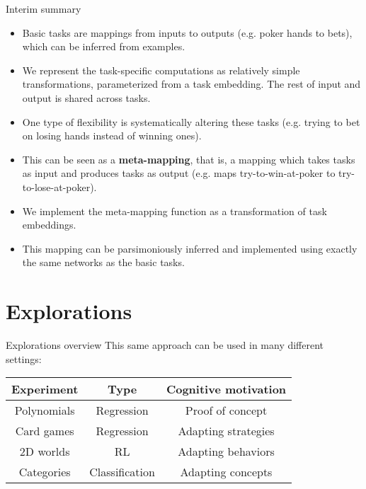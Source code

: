 \documentclass{beamer}
\begin{document}
\begin{frame}{Interim summary}
\begin{itemize}[<+->]
\item Basic tasks are mappings from inputs to outputs (e.g. poker hands to bets), which can be inferred from examples.
\item We represent the task-specific computations as relatively simple transformations, parameterized from a task embedding. The rest of input and output is shared across tasks.
\item One type of flexibility is systematically altering these tasks (e.g. trying to bet on losing hands instead of winning ones).
\item This can be seen as a \textbf{meta-mapping}, that is, a mapping which takes tasks as input and produces tasks as output (e.g. maps try-to-win-at-poker to try-to-lose-at-poker).
\item We implement the meta-mapping function as a transformation of task embeddings.
\item This mapping can be parsimoniously inferred and implemented using exactly the same networks as the basic tasks.
\end{itemize}
\end{frame}

\section{Explorations}

\begin{frame}{Explorations overview}
This same approach can be used in many different settings: 
\begin{table}
\center
\begin{tabular}{|c|c|c|}
\hline
Experiment & Type & Cognitive motivation \\
\hline
\color{lightgray} Polynomials & \color{lightgray} Regression & \color{lightgray} Proof of concept \\
Card games & Regression & Adapting strategies \\
2D worlds & RL & Adapting behaviors \\
Categories & Classification & Adapting concepts \\
\hline
\end{tabular}
\end{table}
\end{frame}

\end{document}
